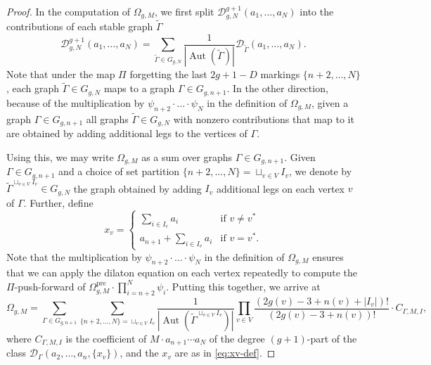 \documentclass[12pt,reqno]{amsart}
\DeclareMathOperator{\Aut}{Aut}
\theoremstyle{plain}
\theoremstyle{definition}
\theoremstyle{remark}
\begin{document}
\begin{proof}
  In the computation of $\Omega_{g, M}$, we first split $\mathcal D_{g, N}^{g+1}(a_1, \dotsc, a_N)$ into the contributions of each stable graph $\widetilde\Gamma$
  \begin{equation*}
    \mathcal D_{g, N}^{g+1}(a_1, \dotsc, a_N)
    = \sum_{\widetilde\Gamma \in G_{g, N}} \frac 1{|\Aut(\widetilde\Gamma)|}\mathcal D_{\widetilde\Gamma}(a_1, \dotsc, a_N).
  \end{equation*}
  Note that under the map $\Pi$ forgetting the last $2g + 1 - D$ markings $\{n+2,\dots,N\}$, each graph $\widetilde\Gamma \in G_{g, N}$ maps to a graph $\Gamma \in G_{g, n + 1}$.
  In the other direction, because of the multiplication by $\psi_{n + 2} \cdot \dots \cdot \psi_N$ in the definition of $\Omega_{g, M}$, given a graph $\Gamma \in G_{g, n + 1}$ all graphs $\widetilde\Gamma \in G_{g, N}$ with nonzero contributions that map to it are obtained by adding additional legs to the vertices of $\Gamma$.

  Using this, we may write $\Omega_{g, M}$ as a sum over graphs $\Gamma \in G_{g, n + 1}$.
  Given $\Gamma \in G_{g,n+1}$ and a choice of set partition $\{n+2, \ldots, N\} = \sqcup_{v\in V} I_v$, we denote by $\widetilde{\Gamma}^{\sqcup_{v\in V}I_v} \in G_{g, N}$ the graph obtained by adding $I_v$ additional legs on each vertex $v$ of $\Gamma$.
  Further, define
  \begin{equation}
    \label{eq:xv-def}
    x_v =
    \begin{cases}
      \sum_{i \in I_v} a_i & \text{if } v \neq v^* \\
      a_{n + 1} + \sum_{i \in I_v} a_i & \text{if } v = v^*.
    \end{cases}
  \end{equation}
  Note that the multiplication by $\psi_{n + 2} \cdot \dots \cdot \psi_N$
  in the definition of $\Omega_{g, M}$ ensures that
  we can apply the dilaton equation on each vertex repeatedly to compute the
  $\Pi$-push-forward of $\Omega_{g,M}^{\text{pre}}\cdot\prod_{i=n+2}^{N}\psi_{i}$.
  Putting this together, we arrive at
  \begin{equation}
    \label{omega_g,m-formula-part1}
    \Omega_{g, M}
    = \sum_{\Gamma\in G_{g,n+1}} \sum_{\{n+2, \ldots, N\} = \sqcup_{v\in V} I_v}
    \frac 1{|\Aut(\widetilde\Gamma^{\sqcup_{v\in V}I_v})|}
    \prod_{v \in V} \frac{(2g(v) - 3 + n(v) + |I_v|)!}{(2g(v) - 3 + n(v))!} \cdot C_{\Gamma, M, I},
  \end{equation}
  where $C_{\Gamma, M, I}$ is the coefficient of $M \cdot a_{n + 1} \cdots a_N$ of the degree $(g + 1)$-part of the class $\mathcal{D}_{\Gamma}(a_2, \dotsc, a_n, \{x_v\})$, and the $x_v$ are as in \eqref{eq:xv-def}.


\end{proof}
\end{document}
